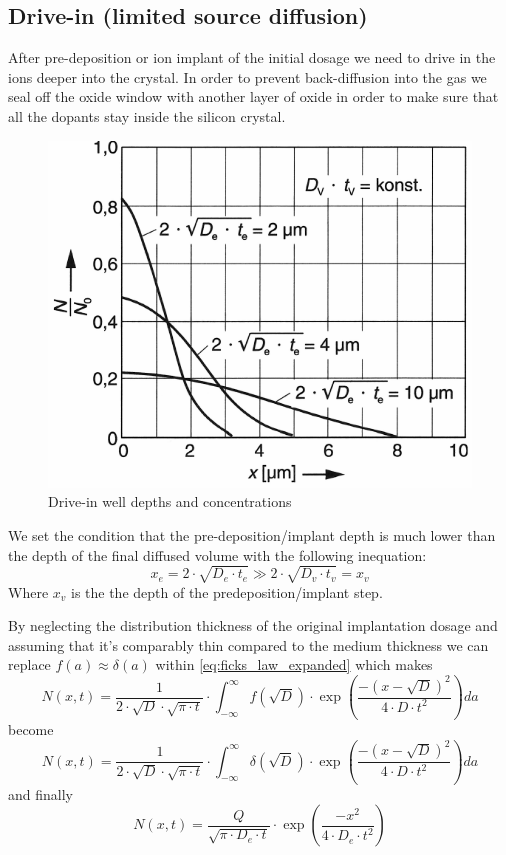 \subsection{Drive-in (limited source diffusion)}\label{physics_drive_in}
After pre-deposition or ion implant of the initial dosage we need to drive in the ions deeper into the crystal.
In order to prevent back-diffusion into the gas we seal off the oxide window with another layer of oxide in order to make sure that all the dopants stay inside the silicon crystal.

\begin{figure}[H]
	\centering
	\includegraphics[scale=0.5]{dopants_drive_in_depth.png}
	\caption{Drive-in well depths and concentrations}
\end{figure}

We set the condition that the pre-deposition/implant depth is much lower than the depth of the final diffused volume with the following inequation:
\begin{equation}
x_e = 2 \cdot \sqrt{D_e \cdot t_e} \gg 2 \cdot \sqrt{D_v \cdot t_v} = x_v
\end{equation}
Where $x_v$ is the the depth of the predeposition/implant step.

By neglecting the distribution thickness of the original implantation dosage and assuming that it's comparably thin compared to the medium thickness we can replace  $f(a) \approx \delta(a)$ within \autoref{eq:ficks_law_expanded} which makes
\begin{equation}
N(x,t) = \frac{1}{2 \cdot \sqrt{D} \cdot \sqrt{\pi \cdot t}} \cdot \int_{-\infty}^{\infty}{f(\sqrt{D})\cdot\exp\left(\frac{-(x-\sqrt{D})^2}{4 \cdot D \cdot t^2}\right)}da
\end{equation}
become
\begin{equation}
N(x,t)
=
\frac{1}{2 \cdot \sqrt{D} \cdot \sqrt{\pi \cdot t}} \cdot \int_{-\infty}^{\infty}{\delta(\sqrt{D})\cdot\exp\left(\frac{-(x-\sqrt{D})^2}{4 \cdot D \cdot t^2}\right)}da
\end{equation}
and finally
\begin{equation}
N(x,t)
=
\frac{Q}{\sqrt{\pi \cdot D_e \cdot t}} \cdot \exp\left(\frac{-x^2}{4 \cdot D_e \cdot t^2}\right)
\end{equation}